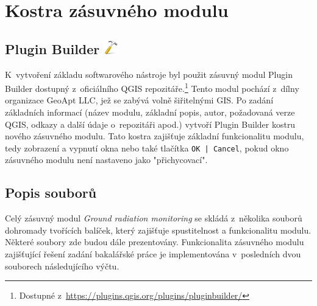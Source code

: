 \section{Kostra zásuvného modulu}
\subsection[Plugin Builder]{Plugin
Builder \includegraphics[scale=0.1]{./pictures/plugin_builder.png}}
K~vytvoření základu softwarového nástroje byl použit zásuvný modul
Plugin Builder dostupný z~oficiálního QGIS
repozitáře.\footnote{Dostupné
z~\url{https://plugins.qgis.org/plugins/pluginbuilder/}} Tento modul
pochází z~dílny organizace GeoApt LLC, jež se zabývá volně šiřitelnými
GIS. Po zadání základních informací (název modulu, základní popis,
autor, požadovaná verze QGIS, odkazy a další údaje o~repozitáři apod.)
vytvoří Plugin Builder kostru nového zásuvného modulu. Tato kostra
zajišťuje základní funkcionalitu modulu, tedy zobrazení a vypnutí okna
nebo také tlačítka \texttt{OK | Cancel}, pokud okno zásuvného modulu
není nastaveno jako "přichycovací".

\subsection{Popis souborů} Celý zásuvný modul \textit{Ground radiation
monitoring} se skládá z~několika souborů dohromady tvořících balíček,
který zajišťuje spustitelnost a funkcionalitu modulu. Některé soubory
zde budou dále prezentovány. Funkcionalita zásuvného modulu
zajišťující řešení zadání bakalářské práce je implementována v~posledních
dvou souborech následujícího výčtu.

